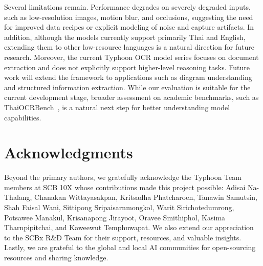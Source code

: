\documentclass[]{typhoon} %
\begin{document}
Several limitations remain. Performance degrades on severely degraded inputs, such as low-resolution images, motion blur, and occlusions, suggesting the need for improved data recipes or explicit modeling of noise and capture artifacts. In addition, although the models currently support primarily Thai and English, extending them to other low-resource languages is a natural direction for future research. Moreover, the current Typhoon OCR model series focuses on document extraction and does not explicitly support higher-level reasoning tasks. Future work will extend the framework to applications such as diagram understanding and structured information extraction. While our evaluation is suitable for the current development stage, broader assessment on academic benchmarks, such as ThaiOCRBench~\citep{nonesung2025thaiocrbenchtaskdiversebenchmarkvisionlanguage}, is a natural next step for better understanding model capabilities.

\section*{Acknowledgments}
Beyond the primary authors, we gratefully acknowledge the Typhoon Team members at SCB 10X whose contributions made this project possible: Adisai Na-Thalang, Chanakan Wittayasakpan, Kritsadha Phatcharoen, Tanawin Samutsin, Shah Faisal Wani, Sittipong Sripaisarnmongkol, Warit Sirichotedumrong, Potsawee Manakul, Krisanapong Jirayoot, Oravee Smithiphol, Kasima Tharnpipitchai, and Kaweewut Temphuwapat. We also extend our appreciation to the SCBx R\&D Team for their support, resources, and valuable insights. Lastly, we are grateful to the global and local AI communities for open-sourcing resources and sharing knowledge.







\end{document}
